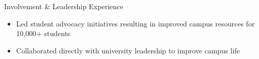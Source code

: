 \documentclass{resume}
\begin{document}
\begin{experienceSection}{Involvement \& Leadership Experience}
    \projectItem[
        title={Student Senate Committee for Student Affairs},
    ]
    \begin{itemize}[topsep=0pt, itemsep=-6pt, leftmargin=2em, rightmargin=0.8em, before=\raggedright, after=\normalfont]
        \vspace{-0.5em}
        \item Led student advocacy initiatives resulting in improved campus resources for 10,000+ students
        \item Collaborated directly with university leadership to improve campus life
    \end{itemize}
    \vspace{-0.5em}
\end{experienceSection}
\end{document}
